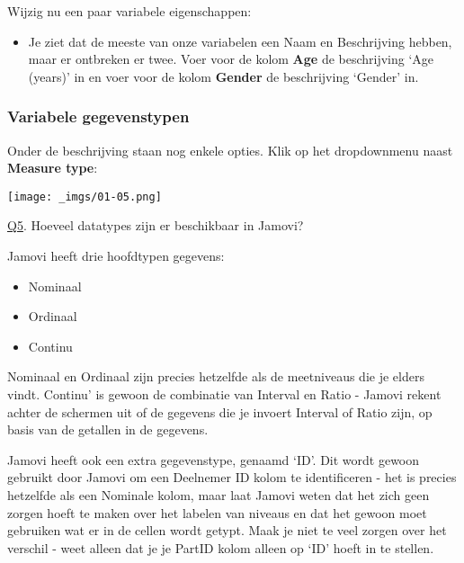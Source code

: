 \documentclass[
  letterpaper,
  DIV=11,
  numbers=noendperiod]{scrartcl}
\providecommand{\tightlist}{%
  \setlength{\itemsep}{0pt}\setlength{\parskip}{0pt}}\usepackage{longtable,booktabs,array}
\begin{document}
Wijzig nu een paar variabele eigenschappen:

\begin{itemize}
\tightlist
\item
  Je ziet dat de meeste van onze variabelen een Naam en Beschrijving
  hebben, maar er ontbreken er twee. Voer voor de kolom \textbf{Age} de
  beschrijving `Age (years)' in en voer voor de kolom \textbf{Gender} de
  beschrijving `Gender' in.
\end{itemize}

\hypertarget{variabele-gegevenstypen}{%
\subsubsection{Variabele gegevenstypen}\label{variabele-gegevenstypen}}

Onder de beschrijving staan nog enkele opties. Klik op het dropdownmenu
naast \textbf{Measure type}:

\texttt{[image: \_imgs/01-05.png]}

\begin{tcolorbox}[beforeafter skip=1cm, ignore nobreak=true, breakable, colframe=Questions-frame, colback=Questions-bg, coltext=Questions-text, boxsep=2mm, arc=0mm, boxrule=0.5mm]

\protect\hypertarget{Q5}{\protect\hyperlink{A5}{Q5}}. Hoeveel datatypes
zijn er beschikbaar in Jamovi?

\end{tcolorbox}

Jamovi heeft drie hoofdtypen gegevens:

\begin{itemize}
\tightlist
\item
  Nominaal
\item
  Ordinaal
\item
  Continu
\end{itemize}

Nominaal en Ordinaal zijn precies hetzelfde als de meetniveaus die je
elders vindt. Continu' is gewoon de combinatie van Interval en Ratio -
Jamovi rekent achter de schermen uit of de gegevens die je invoert
Interval of Ratio zijn, op basis van de getallen in de gegevens.

Jamovi heeft ook een extra gegevenstype, genaamd `ID'. Dit wordt gewoon
gebruikt door Jamovi om een Deelnemer ID kolom te identificeren - het is
precies hetzelfde als een Nominale kolom, maar laat Jamovi weten dat het
zich geen zorgen hoeft te maken over het labelen van niveaus en dat het
gewoon moet gebruiken wat er in de cellen wordt getypt. Maak je niet te
veel zorgen over het verschil - weet alleen dat je je PartID kolom
alleen op `ID' hoeft in te stellen.
\end{document}

